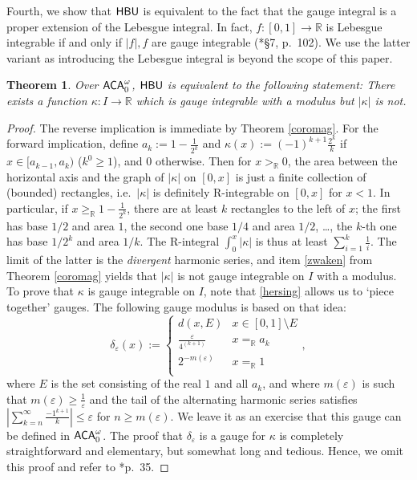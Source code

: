 \documentclass[reqno]{amsart}
\newtheorem{thm}{Theorem}
\def\ACAo{\textup{\textsf{ACA}}_{0}^{\omega}}
\def\R{{\mathbb  R}}
\def\di{\rightarrow}
\def\ACA{\textup{\textsf{ACA}}}
\def\HBU{\textup{\textsf{HBU}}}
\def\eps{\varepsilon}
\numberwithin{equation}{section}
\numberwithin{thm}{section}
\begin{document}
Fourth, we show that $\HBU$ is equivalent to the fact that the gauge integral is a proper extension of the Lebesgue integral.   
In fact, $f:[0,1]\di \R$ is Lebesgue integrable if and only if $|f|, f$ are gauge integrable (\cite{bartle}*{\S7, p.\ 102}).      
We use the latter variant as introducing the Lebesgue integral is beyond the scope of this paper.  
\begin{thm} Over $\ACA_{0}^{\omega}$, $\HBU$ is equivalent to the following statement:
 There exists a function $\kappa:I\di \R$ which is gauge integrable with a modulus but $|\kappa|$ is not.
\end{thm}
\begin{proof}
The reverse implication is immediate by Theorem \ref{coromag}.
For the forward implication, define $a_{k}:=1-\frac{1}{2^{k}}$ and $\kappa(x):=(-1)^{k+1}\frac{2^{k}}{k}$ if $x\in [a_{k-1}, a_{k})$ ($k^{0}\geq 1$), and $0$ otherwise. 
Then for $x>_{\R}0$, the area between the horizontal axis and the graph of $|\kappa|$ on $[0,x]$ is just a finite collection of (bounded) rectangles, i.e.\ $|\kappa|$ is definitely R-integrable on $[0,x]$ for $x<1$.
In particular, if $x\geq_{\R}1-\frac{1}{2^{k}}$, there are at least $k$ rectangles to the left of $x$; the first has base $1/2$ and area $1$, the second one base $1/4$ and area $1/2$, \dots, the $k$-th one has base $1/2^{k}$ and area $1/k$.  The R-integral $\int_{0}^{x}|\kappa|$ is thus at least $\sum_{i=1}^{k}\frac{1}{i}$.  The limit of the latter is the \emph{divergent} harmonic series, and item \eqref{zwaken} from Theorem \ref{coromag} yields that $|\kappa|$ is not gauge integrable on $I$ with a modulus.
To prove that $\kappa$ is gauge integrable on $I$, note that \eqref{hersing} allows us to `piece together' gauges.  
The following gauge modulus is based on that idea:
\[
\delta_{\eps}(x):=
\begin{cases}
d(x, E) & x \in [0,1]\setminus E  \\
\frac{\eps}{4^{(k+1)}}& x=_{\R}a_{k}\\
2^{-m(\eps)}&x=_{\R}1\\
\end{cases},
\]
where $E$ is the set consisting of the real $1$ and all $a_{k}$, and where $m(\eps)$ is such that $m(\eps)\geq \frac{1}{\eps}$ and the tail of the alternating harmonic series satisfies $|\sum_{k=n}^{\infty}\frac{-1^{k+1}}{k}|\leq \eps$ for $n\geq m(\eps)$.
We leave it as an exercise that this gauge can be defined in $\ACAo$.
The proof that $\delta_{\eps}$ is a gauge for $\kappa$ is completely straightforward and elementary, but somewhat long and tedious.  Hence, we omit this proof and refer to \cite{bartle}*{p.\ 35}. 
\end{proof}
\end{document}
